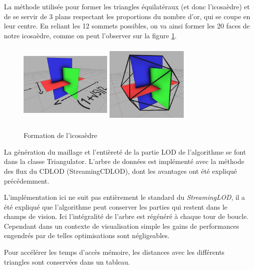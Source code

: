 	La méthode utilisée pour former les triangles équilatéraux (et donc l'icosaèdre) et de se servir de 3 plans respectant les proportions du nombre d'or, qui se coupe en leur centre. En reliant les 12 sommets possibles, on va ainsi former les 20 faces de notre icosaèdre, comme on peut l'observer sur la figure \ref{fig:plans-icosaèdre}.
	
	\begin{figure}[H]
        \centerline{
            \includegraphics[height=4cm,width=4.5cm]{img/3plans.png}
            \includegraphics[height=4cm,width=4cm]{img/3plans2.png}}
        \caption{Formation de l'icosaèdre \protect\footnotemark}
        \label{fig:plans-icosaèdre}
	\end{figure}
	
	
	
	La génération du maillage et l'entièreté de la partie LOD de l'algorithme se font dans la classe Triangulator. L'arbre de données est implémenté avec la méthode des flux du CDLOD (StreamingCDLOD), dont les avantages ont été expliqué précédemment.
	
	L'implémentation ici ne suit pas entièrement le standard du \textit{StreamingLOD}, il a été expliqué que l'algorithme peut conserver les parties qui restent dans le champs de vision. Ici l'intégralité de l'arbre est régénéré à chaque tour de boucle. Cependant dans un contexte de visualisation simple les gains de performances engendrés par de telles optimisations sont négligeables.
	
	Pour accélérer les temps d'accès mémoire, les distances avec les différents triangles sont conservées
	dans un tableau. \\

